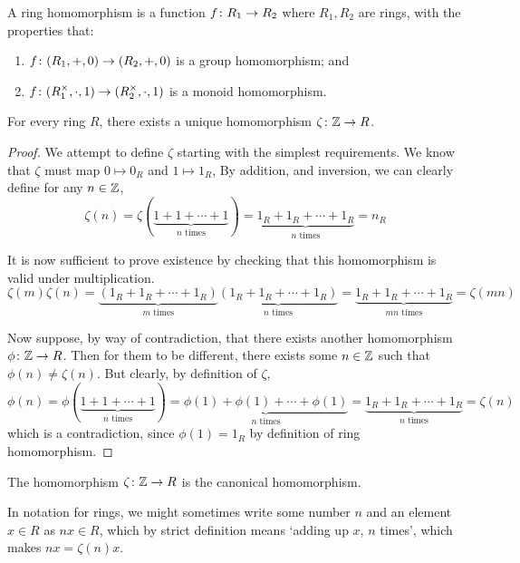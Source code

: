 \begin{definition}
    A ring homomorphism is a function \(f\colon R_1\to R_2\)
    where \(R_1,R_2\) are rings,
    with the properties that:
    \begin{enumerate}[label={(\roman*)}, itemsep=0mm]
        \item \(f\colon(R_1,+,0)\to(R_2,+,0)\) is a group homomorphism; and
        \item \(f\colon(R_1^\times,\cdot,1)\to(R_2^\times,\cdot,1)\)
            is a monoid homomorphism.
    \end{enumerate}
\end{definition}
\begin{proposition}
    For every ring \(R\),
    there exists a unique homomorphism \(\zeta\colon\mathbb{Z}\to R\).
\end{proposition}
\begin{proof}
    We attempt to define \(\zeta\) starting with the simplest requirements.
    We know that \(\zeta\) must map \(0 \mapsto 0_R\) and \(1 \mapsto 1_R\),
    By addition, and inversion,
    we can clearly define for any \(n \in \mathbb{Z}\),
    \begin{equation*}
        \zeta(n) = \zeta(\underbrace{1+1+\cdots+1}_\textrm{\(n\) times})
    = \underbrace{1_R + 1_R + \cdots + 1_R}_\textrm{\(n\) times} = n_R
    \end{equation*}

    It is now sufficient to prove existence
    by checking that this homomorphism is valid under multiplication.
    \begin{equation*}
        \zeta(m)\zeta(n)
        = \underbrace{(1_R + 1_R + \cdots + 1_R)}_\textrm{\(m\) times}
        \underbrace{(1_R + 1_R + \cdots + 1_R)}_\textrm{\(n\) times}
        = \underbrace{1_R + 1_R + \cdots + 1_R}_\textrm{\(mn\) times}
        = \zeta(mn)
    \end{equation*}

    Now suppose, by way of contradiction,
    that there exists another homomorphism \(\phi\colon\mathbb{Z}\to R\).
    Then for them to be different,
    there exists some \(n \in \mathbb{Z}\) such that \(\phi(n) \neq \zeta(n)\).
    But clearly, by definition of \(\zeta\),
    \begin{equation*}
        \phi(n) = \phi(\underbrace{1+1+\cdots+1}_\textrm{\(n\) times})
        = \underbrace{\phi(1)+\phi(1)+\cdots+\phi(1)}_\textrm{\(n\) times}
        = \underbrace{1_R + 1_R + \cdots + 1_R}_\textrm{\(n\) times}
        = \zeta(n)
    \end{equation*}
    which is a contradiction,
    since \(\phi(1) = 1_R\) by definition of ring homomorphism.
\end{proof}
\begin{definition}
    The homomorphism \(\zeta\colon\mathbb{Z}\to R\)
    is the canonical homomorphism.
\end{definition}
\begin{remark}
    In notation for rings,
    we might sometimes write some number \(n\)
    and an element \(x \in R\) as \(nx \in R\),
    which by strict definition means `adding up \(x\), \(n\) times',
    which makes \(nx = \zeta(n)x\).
\end{remark}


